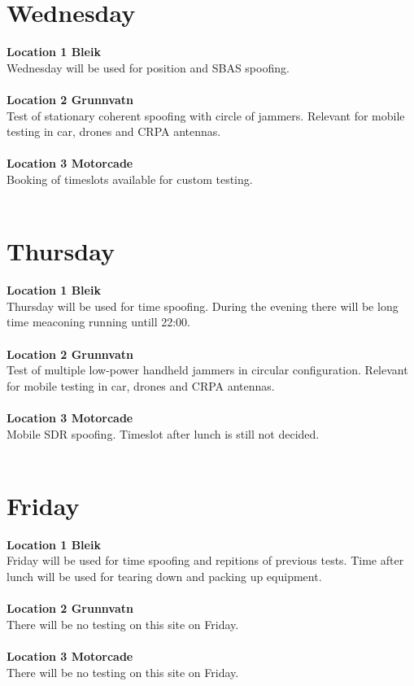 \documentclass[a4paper]{book}
\begin{document}
\begin{landscape}
\chapter{Wednesday}
\Large \textbf{Location 1 Bleik} \\
Wednesday will be used for position and SBAS spoofing. \\ \\
\Large \textbf{Location 2 Grunnvatn} \\
Test of stationary coherent spoofing with circle of jammers. Relevant for mobile testing in car, drones and CRPA antennas.\\ \\
\Large \textbf{Location 3 Motorcade} \\
Booking of timeslots available for custom testing.\\ \\

%

\chapter{Thursday}
\Large \textbf{Location 1 Bleik} \\
Thursday will be used for time spoofing. During the evening there will be long time meaconing running untill 22:00.\\ \\
\Large \textbf{Location 2 Grunnvatn} \\
Test of multiple low-power handheld jammers in circular configuration. Relevant for mobile testing in car, drones and CRPA antennas.\\ \\
\Large \textbf{Location 3 Motorcade} \\
Mobile SDR spoofing. Timeslot after lunch is still not decided.\\ \\

%

\chapter{Friday}
\Large \textbf{Location 1 Bleik} \\
Friday will be used for time spoofing and repitions of previous tests. Time after lunch will be used for tearing down and packing up equipment.\\ \\
\Large \textbf{Location 2 Grunnvatn} \\
There will be no testing on this site on Friday.\\ \\
\Large \textbf{Location 3 Motorcade} \\
There will be no testing on this site on Friday.\\ \\

%

\end{landscape}
\end{document}
